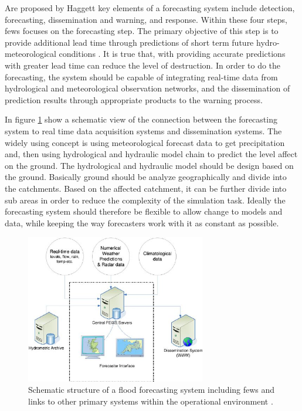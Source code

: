 Are proposed by Haggett \cite{Haggett1998AnWales} key elements of a forecasting system include detection, forecasting, dissemination and warning, and response. Within these four steps, \acrshort{fews} focuses on the forecasting step. The primary objective of this step is to provide additional lead time through predictions of short term future hydro-meteorological conditions \cite{Werner2005FloodCatchments}. It is true that, with providing accurate predictions with greater lead time can reduce the level of destruction. In order to do the forecasting, the system should be capable of integrating real-time data from hydrological and meteorological observation networks, and the dissemination of prediction results through appropriate products to the warning process.

In figure \ref{fi:fews_schematic} show a schematic view of the connection between the forecasting system to real time data acquisition systems and dissemination systems. The widely using concept is using meteorological forecast data to get precipitation and, then using hydrological and hydraulic model chain to predict the level affect on the ground. The hydrological and hydraulic model should be design based on the ground. Basically ground should be analyze geographically and divide into the catchments. Based on the affected catchment, it can be further divide into sub areas in order to reduce the complexity of the simulation task. Ideally the forecasting system should therefore be flexible to allow change to models and data, while keeping the way forecasters work with it as constant as possible.

\begin{figure}[htp]
    \centering
    \includegraphics[width=0.7\textwidth]{fews/Schematic-structure-of-a-fl-ood-forecasting-system-showing-the-position-of-Delft-FEWS_W640.jpg}
    \caption[Schematic structure of a flood forecasting system including \acrshort{fews} and links to other primary systems within the operational environment]{Schematic structure of a flood forecasting system including \acrshort{fews} and links to other primary systems within the operational environment \cite{Werner2013TheSystem}.}
    \label{fi:fews_schematic}
\end{figure}

